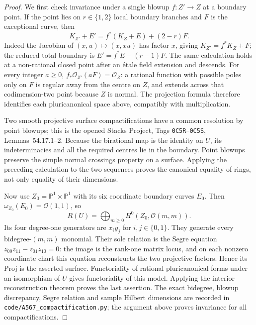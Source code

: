 \begin{proof}
We first check invariance under a single blowup $f:Z'\to Z$
at a boundary point. If the point lies on $r\in\{1,2\}$ local
boundary branches and $F$ is the exceptional curve, then
\[
 K_{Z'}+E'=f^*(K_Z+E)+(2-r)F.
\]
Indeed the Jacobian of $(x,u)\mapsto(x,xu)$ has factor $x$,
giving $K_{Z'}=f^*K_Z+F$; the reduced total boundary is
$E'=f^*E-(r-1)F$. The same calculation holds at a non-rational
closed point after an \'etale field extension and descends.
For every integer $a\ge0$,
$f_*\mathcal O_{Z'}(aF)=\mathcal O_Z$: a rational function with
possible poles only on $F$ is regular away from the centre on
$Z$, and extends across that codimension-two point because $Z$
is normal. The projection formula therefore identifies each
pluricanonical space above, compatibly with multiplication.

Two smooth projective surface compactifications have a common
resolution by point blowups; this is the opened Stacks Project,
Tags \texttt{0C5R}--\texttt{0C5S}, Lemmas~54.17.1--2. Because
the birational map is the identity on $U$, its indeterminacies
and all the required centres lie in the boundary. Point blowups
preserve the simple normal crossings property on a surface.
Applying the preceding calculation to the two sequences proves
the canonical equality of rings, not only equality of their
dimensions.

Now use $Z_0=\mathbb P^1\times\mathbb P^1$ with its six
coordinate boundary curves $E_0$. Then
$\omega_{Z_0}(E_0)=\mathcal O(1,1)$, so
\[
 R(U)=\bigoplus_{m\ge0}H^0(Z_0,\mathcal O(m,m)).
\]
Its four degree-one generators are $x_i y_j$ for $i,j\in\{0,1\}$.
They generate every bidegree-$(m,m)$ monomial. Their sole relation
is the Segre equation $z_{00}z_{11}-z_{01}z_{10}=0$:
the image is the rank-one matrix locus, and on each nonzero
coordinate chart this equation reconstructs the two projective
factors. Hence its Proj is the asserted surface. Functoriality of
rational pluricanonical forms under an isomorphism of $U$ gives
functoriality of this model. Applying the interior reconstruction
theorem proves the last assertion. The exact bidegree, blowup
discrepancy, Segre relation and sample Hilbert dimensions are
recorded in \texttt{code/A567\_compactification.py}; the argument
above proves invariance for all compactifications.
\end{proof}

